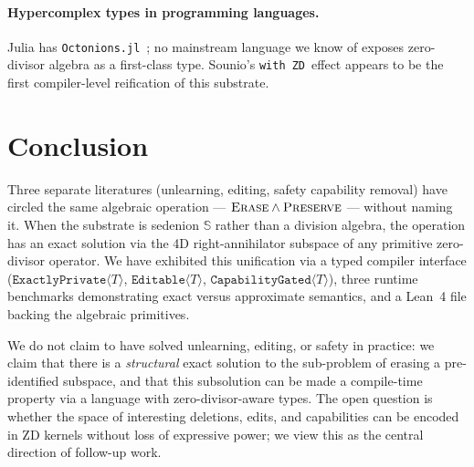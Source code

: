 \documentclass{article}
\newcommand{\sio}{\mathbb{S}}
\newcommand{\ExactlyPrivate}[1]{\texttt{ExactlyPrivate}\langle #1 \rangle}
\newcommand{\Editable}[1]{\texttt{Editable}\langle #1 \rangle}
\newcommand{\CapabilityGated}[1]{\texttt{CapabilityGated}\langle #1 \rangle}
\newcommand{\withZD}{\texttt{with ZD}}
\begin{document}
\paragraph{Hypercomplex types in programming languages.}  Julia has
\texttt{Octonions.jl}~\cite{julia_octonions}; no mainstream language we
know of exposes zero-divisor algebra as a first-class type.  Sounio's
\withZD~effect appears to be the first compiler-level reification of
this substrate.

\section{Conclusion}

Three separate literatures (unlearning, editing, safety capability
removal) have circled the same algebraic operation
--- $\textsc{Erase} \land \textsc{Preserve}$ --- without naming it.
When the substrate is sedenion $\sio$ rather than a division algebra,
the operation has an exact solution via the 4D right-annihilator subspace
of any primitive zero-divisor operator.  We have exhibited this unification
via a typed compiler interface ($\ExactlyPrivate{T}$, $\Editable{T}$,
$\CapabilityGated{T}$), three runtime benchmarks demonstrating exact versus
approximate semantics, and a Lean~4 file backing the algebraic primitives.

We do not claim to have solved unlearning, editing, or safety in practice:
we claim that there is a \emph{structural} exact solution to the
sub-problem of erasing a pre-identified subspace, and that this
subsolution can be made a compile-time property via a language with
zero-divisor-aware types.  The open question is whether the space of
interesting deletions, edits, and capabilities can be encoded in ZD
kernels without loss of expressive power; we view this as the central
direction of follow-up work.
\end{document}

